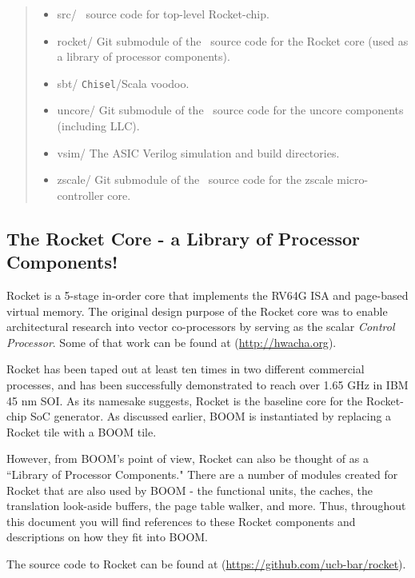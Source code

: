 \begin{quote}
\begin{itemize}
\begin{itemize}
  \item src/ {\footnotesize \color{red} \Chisel\ source code for top-level Rocket-chip.}
  \item rocket/ {\footnotesize \color{red} Git submodule of the \Chisel\ source code for the Rocket core (used as a library of processor components).}
      \item sbt/ {\footnotesize \color{red} {\tt Chisel}/Scala voodoo.}
  \item uncore/ {\footnotesize \color{red} Git submodule of the \Chisel\ source code for the uncore components (including LLC).}
    \item vsim/ {\footnotesize \color{red} The ASIC Verilog simulation and build directories. }
    \item zscale/ {\footnotesize \color{red} Git submodule of the \Chisel\ source code for the zscale micro-controller core. }
   
\end{itemize}
\end{itemize}
\end{quote}

\subsection{The Rocket Core - a Library of Processor Components!}\label{sec:rocket}

Rocket is a 5-stage in-order core that implements the RV64G ISA and page-based virtual memory.  The original design purpose of the Rocket core was to enable architectural research into vector co-processors by serving as the scalar {\em Control Processor}.  Some of that work can be found at (\url{http://hwacha.org}).\cite{hwacha} 

Rocket has been taped out at least ten times in two different commercial processes, and has been successfully demonstrated to reach over 1.65 GHz in IBM 45 nm SOI.\cite{riscv_nature} As its namesake suggests, Rocket is the baseline core for the Rocket-chip SoC generator. As discussed earlier, BOOM is instantiated by replacing a Rocket tile with a BOOM tile. 

However, from BOOM's point of view, Rocket can also be thought of as a ``Library of Processor Components."  There are a number of modules created for Rocket that are also used by BOOM - the functional units, the caches, the translation look-aside buffers, the page table walker, and more.  Thus, throughout this document you will find references to these Rocket components and descriptions on how they fit into BOOM.

The source code to Rocket can be found at (\url{https://github.com/ucb-bar/rocket}).\cite{rocket}  

